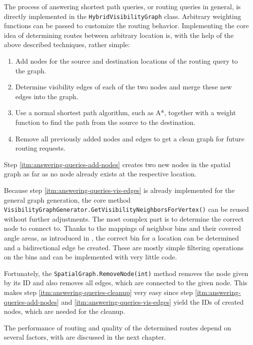 	The process of answering shortest path queries, or routing queries in general, is directly implemented in the \texttt{HybridVisibilityGraph} class.
	Arbitrary weighting functions can be passed to customize the routing behavior.
	Implementing the core idea of determining routes between arbitrary location is, with the help of the above described techniques, rather simple:
	\begin{enumerate}
		\item \label{itm:answering-queries-add-nodes} Add nodes for the source and destination locations of the routing query to the graph.
		\item \label{itm:answering-queries-vis-edges} Determine visibility edges of each of the two nodes and merge these new edges into the graph.
		\item \label{itm:answering-queries-routing} Use a normal shortest path algorithm, such as A*, together with a weight function to find the path from the source to the destination.
		\item \label{itm:answering-queries-cleanup} Remove all previously added nodes and edges to get a clean graph for future routing requests.
	\end{enumerate}
	Step \ref{itm:answering-queries-add-nodes} creates two new nodes in the spatial graph as far as no node already exists at the respective location.
	
	Because step \ref{itm:answering-queries-vis-edges} is already implemented for the general graph generation, the core method \texttt{VisibilityGraphGenerator.GetVisibilityNeighborsForVertex()} can be reused without further adjustments.
	The most complex part is to determine the correct node to connect to.
	Thanks to the mappings of neighbor bins and their covered angle areas, as introduced in , the correct bin for a location can be determined and a bidirectional edge be created.
	These are mostly simple filtering operations on the bins and can be implemented with very little code.
	
	Fortunately, the \texttt{SpatialGraph.RemoveNode(int)} method removes the node given by its ID and also removes all edges, which are connected to the given node.
	This makes step \ref{itm:answering-queries-cleanup} very easy since step \ref{itm:answering-queries-add-nodes} and \ref{itm:answering-queries-vis-edges} yield the IDs of created nodes, which are needed for the cleanup.
	
	The performance of routing and quality of the determined routes depend on several factors, with are discussed in the next chapter.
